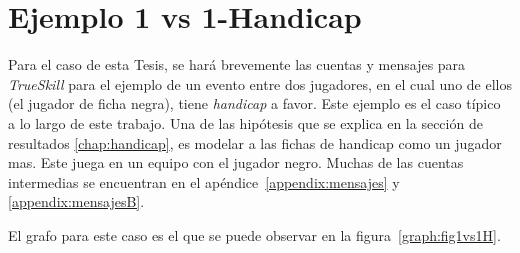 \documentclass[11pt,twoside, spanish]{report} %
\begin{document}

\section{Ejemplo 1 vs 1-Handicap}

Para el caso de esta Tesis, se har\'a brevemente las cuentas y mensajes para \textit{TrueSkill} para el ejemplo de un evento entre dos jugadores, en el cual uno de ellos (el jugador de ficha negra), tiene \textit{handicap} a favor.
Este ejemplo es el caso t\'ipico a lo largo de este trabajo.
Una de las hip\'otesis que se explica en la secci\'on de resultados \ref{chap:handicap}, es modelar a las fichas de handicap como un jugador mas.
Este juega en un equipo con el jugador negro.
Muchas de las cuentas intermedias se encuentran en el ap\'endice~\ref{appendix:mensajes} y \ref{appendix:mensajesB}.

El grafo para este caso es el que se puede observar en la figura~\ref{graph:fig1vs1H}.
\end{document}
